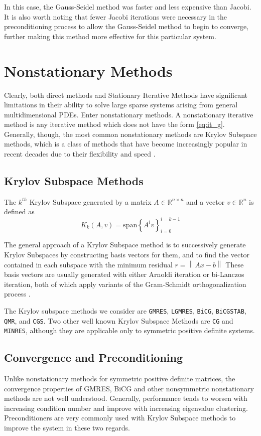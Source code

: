\documentclass[10pt]{article}
\newcommand\norm[1]{\left\lVert #1 \right\rVert}
\begin{document}
\begin{multicols}{2}
In this case, the Gauss-Seidel method was faster and less expensive than Jacobi.
It is also worth noting that fewer Jacobi iterations were necessary in the preconditioning process to allow the Gauss-Seidel method to begin to converge, further making this method more effective for this particular system.

\section{Nonstationary Methods}
Clearly, both direct methods and Stationary Iterative Methods have significant limitations in their ability to solve large sparse systems arising from general multidimensional PDEs.
Enter nonstationary methods.
A nonstationary iterative method is any iterative method which does not have the form \eqref{eq:it_g}.
Generally, though, the most common nonstationary methods are Krylov Subspace methods, which is a class of methods that have become increasingly popular in recent decades due to their flexibility and speed \citep{gutknecht_brief_2007}.

\subsection{Krylov Subspace Methods}

The $k^{th}$ Krylov Subspace generated by a matrix $A \in \mathbb{R}^{n\times n}$ and a vector $v \in \mathbb{R}^n$ is defined as
\begin{equation}
	K_k(A,v) = \mbox{span}\left\{A^iv\right\}_{i=0}^{i=k-1}
\end{equation}

The general approach of a Krylov Subspace method is to successively generate Krylov Subspaces by constructing basis vectors for them, and to find the vector contained in each subspace with the minimum residual $r = \norm{Ax-b}$
These basis vectors are usually generated with either Arnoldi iteration or bi-Lanczos iteration, both of which apply variants of the Gram-Schmidt orthogonalization process \citep{ghai_comparison_2016}.

The Krylov subspace methods we consider are \texttt{GMRES}, \texttt{LGMRES}, \texttt{BiCG}, \texttt{BiCGSTAB}, \texttt{QMR}, and \texttt{CGS}.
Two other well known Krylov Subspace Methods are \texttt{CG} and \texttt{MINRES}, although they are applicable only to symmetric positive definite systems.

\subsection{Convergence and Preconditioning}
Unlike nonstationary methods for symmetric positive definite matrices, the convergence properties of GMRES, BiCG and other nonsymmetric nonstationary methods are not well understood.
Generally, performance tends to worsen with increasing condition number and improve with increasing eigenvalue clustering.
Preconditioners are very commonly used with Krylov Subspace methods to improve the system in these two regards.


\end{multicols}
\end{document}
